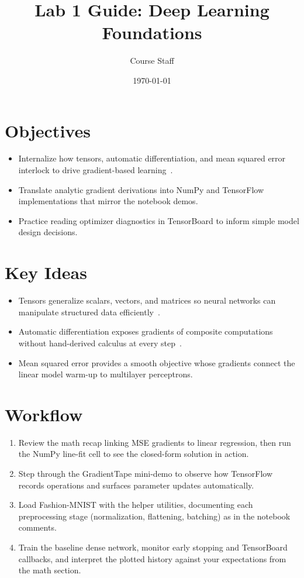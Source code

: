 \documentclass[11pt]{article}
\title{Lab 1 Guide: Deep Learning Foundations}
\author{Course Staff}
\date{\today}
\begin{document}
\maketitle

\section*{Objectives}
\begin{itemize}[leftmargin=*]
    \item Internalize how tensors, automatic differentiation, and mean squared error interlock to drive gradient-based learning~\cite{goodfellow2016deep,geron2022hands}.
    \item Translate analytic gradient derivations into NumPy and TensorFlow implementations that mirror the notebook demos.
    \item Practice reading optimizer diagnostics in TensorBoard to inform simple model design decisions.
\end{itemize}

\section*{Key Ideas}
\begin{itemize}[leftmargin=*]
    \item Tensors generalize scalars, vectors, and matrices so neural networks can manipulate structured data efficiently~\cite{goodfellow2016deep}.
    \item Automatic differentiation exposes gradients of composite computations without hand-derived calculus at every step~\cite{geron2022hands}.
    \item Mean squared error provides a smooth objective whose gradients connect the linear model warm-up to multilayer perceptrons.
\end{itemize}

\section*{Workflow}
\begin{enumerate}[leftmargin=*]
    \item Review the math recap linking MSE gradients to linear regression, then run the NumPy line-fit cell to see the closed-form solution in action.
    \item Step through the GradientTape mini-demo to observe how TensorFlow records operations and surfaces parameter updates automatically.
    \item Load Fashion-MNIST with the helper utilities, documenting each preprocessing stage (normalization, flattening, batching) as in the notebook comments.
    \item Train the baseline dense network, monitor early stopping and TensorBoard callbacks, and interpret the plotted history against your expectations from the math section.
\end{enumerate}
\end{document}
